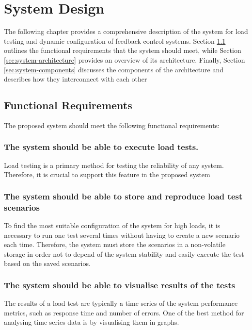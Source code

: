 \usepackage{graphicx}
\graphicspath{{figs/}} %
\chapter{System Design}
\label{ch:lr}

The following chapter provides a comprehensive description of the system for load testing and dynamic configuration of feedback control systems. Section \ref{sec:functional-requirements} outlines the functional requirements that the system should meet, while Section \ref{sec:system-architecture} provides an overview of its architecture. Finally, Section \ref{sec:system-components} discusses the components of the architecture and describes how they interconnect with each other

\section{Functional Requirements}\label{sec:functional-requirements}
The proposed system should meet the following functional requirements:
\subsection{The system should be able to execute load tests.}\label{subsec:req-execute-load-test}
Load testing is a primary method for testing the reliability of any system. Therefore, it is crucial to support this feature in the proposed system

\subsection{The system should be able to store and reproduce load test scenarios}\label{subsec:req-store-load-test}
To find the most suitable configuration of the system for high loads, it is necessary to run one test several times without having to create a new scenario each time. Therefore, the system must store the scenarios in a non-volatile storage in order not to depend of the system stability and easily execute the test based on the saved scenarios.

\subsection{The system should be able to visualise results of the tests}\label{subsec:req-visualise-load-test}
The results of a load test are typically a time series of the system performance metrics, such as response time and number of errors. One of the best method for analysing time series data is by visualising them in graphs.

